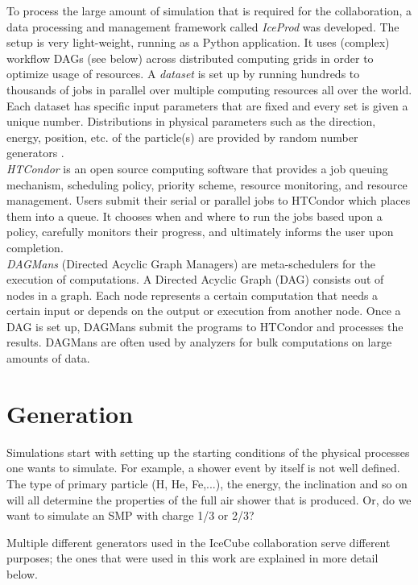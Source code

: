 \noindent To process the large amount of simulation that is required for the collaboration, a data processing and management framework called \textit{IceProd} was developed. The setup is very light-weight, running as a Python application. It uses (complex) workflow DAGs (see below) across distributed computing grids in order to optimize usage of resources. A \textit{dataset} is set up by running hundreds to thousands of jobs in parallel over multiple computing resources all over the world. Each dataset has specific input parameters that are fixed and every set is given a unique number. Distributions in physical parameters such as the direction, energy, position, etc. of the particle(s) are provided by random number generators \cite{1742-6596-664-6-062056}.\\

\noindent \textit{HTCondor} is an open source computing software that provides a job queuing mechanism, scheduling policy, priority scheme, resource monitoring, and resource management. Users submit their serial or parallel jobs to HTCondor which places them into a queue. It chooses when and where to run the jobs based upon a policy, carefully monitors their progress, and ultimately informs the user upon completion.\\

\noindent \textit{DAGMans} (Directed Acyclic Graph Managers) are meta-schedulers for the execution of computations. A Directed Acyclic Graph (DAG) consists out of nodes in a graph. Each node represents a certain computation that needs a certain input or depends on the output or execution from another node. Once a DAG is set up, DAGMans submit the programs to HTCondor and processes the results. DAGMans are often used by analyzers for bulk computations on large amounts of data.

\section{Generation}
Simulations start with setting up the starting conditions of the physical processes one wants to simulate. For example, a shower event by itself is not well defined. The type of primary particle (H, He, Fe,...), the energy, the inclination and so on will all determine the properties of the full air shower that is produced. Or, do we want to simulate an SMP with charge 1/3 or 2/3? 

Multiple different generators used in the IceCube collaboration serve different purposes; the ones that were used in this work are explained in more detail below.

